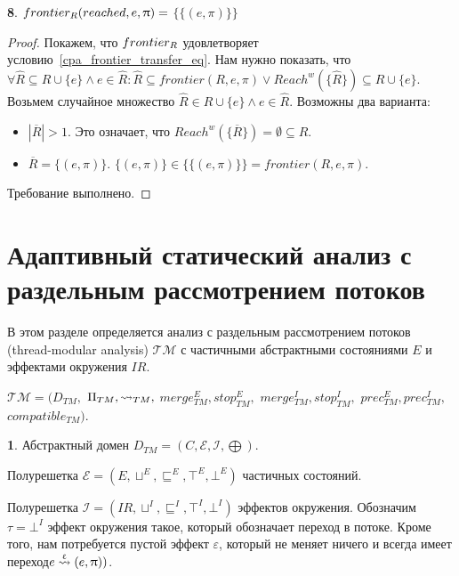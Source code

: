 {\textbf 8.} 
$frontier_R(reached, e, \uppi)=$
$\{\{(e, \pi)\}\}$

\begin{proof}
Покажем, что $frontier_R$ удовлетворяет условию~\ref{cpa_frontier_transfer_eq}.
Нам нужно показать, что
$\forall \widehat{R} \subseteq R \cup \{e\} \land e \in \widehat{R}: \widehat{R} \subseteq frontier(R, e, \pi) \lor Reach^w(\{\widehat{R}\}) \subseteq R \cup \{e\}$. 
Возьмем случайное множество $\widehat{R} \in R \cup \{e\} \land e \in \widehat{R}$. Возможны два варианта:

\begin{itemize}
\item $|\overline{R}| > 1$. Это означает, что $Reach^w(\{\overline{R}\}) = \emptyset \subseteq R$.
\item $\overline{R} = \{(e, \pi)\}$. $\{(e, \pi)\} \in \{\{(e, \pi)\}\} = frontier(R, e, \pi)$.
\end{itemize}

Требование выполнено.

\end{proof}

\newcommand{\IR}{IR}
\newcommand{\epp}{\mathrel{\bigoplus}}
\newcommand{\conctm}[1]{\conc{#1}_{TM}}

\section{Адаптивный статический анализ с раздельным рассмотрением потоков}
\label{sect_tm_with_io}

В этом разделе определяется анализ с раздельным рассмотрением потоков (thread-modular analysis) $\mathcal{TM}$ с частичными абстрактными состояниями $E$ и эффектами окружения $\IR$.

$\mathcal{TM}=(D_{TM},$ $\Pi_{TM}, \leadsto_{TM},$ $merge^E_{TM}, stop^E_{TM},$ $merge^I_{TM}, stop^I_{TM},$ $prec^E_{TM}, prec^I_{TM},$ $compatible_{TM})$.

{\textbf 1.}
Абстрактный домен $D_{TM} = (C, \mathcal{E}, \mathcal{I}, \epp)$.

Полурешетка $\mathcal{E}=(E, \sqcup^E, \sqsubseteq^E, \top^E, \bot^E)$ частичных состояний.

Полурешетка %
$\mathcal{I}=(\IR, \sqcup^I, \sqsubseteq^I, \top^I, \bot^I)$ эффектов окружения.
Обозначим $\tau=\bot^I$ эффект окружения такое, который обозначает переход в потоке.
Кроме того, нам потребуется пустой эффект $\varepsilon$, который не меняет ничего и всегда имеет переход$e \stackrel{\upvarepsilon}{\leadsto} (e, \uppi))$.

